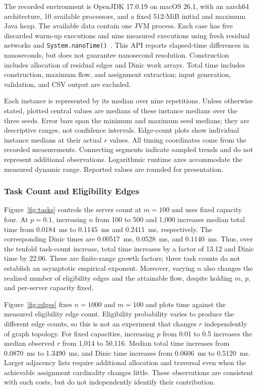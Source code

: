 \documentclass[conference]{IEEEtran}
\theoremstyle{definition}
\theoremstyle{remark}
\begin{document}
The recorded environment is OpenJDK 17.0.19 on macOS 26.1, with an aarch64
architecture, 10 available processors, and a fixed 512-MiB initial and maximum
Java heap. The available data contain one JVM process. Each case has five
discarded warm-up executions and nine measured executions using fresh residual
networks and \texttt{System.nanoTime()}~\cite{oracleNanoTime}. This API reports
elapsed-time differences in nanoseconds, but does not guarantee nanosecond
resolution. Construction includes allocation of
residual edges and Dinic work arrays. Total time includes construction, maximum
flow, and assignment extraction; input generation, validation, and CSV output
are excluded.

Each instance is represented by its median over nine repetitions. Unless
otherwise stated, plotted central values are medians of these instance medians
over the three seeds. Error bars span the minimum and maximum seed medians;
they are descriptive ranges, not confidence intervals. Edge-count plots show
individual instance medians at their actual $r$ values. All timing coordinates
come from the recorded measurements. Connecting segments indicate sampled
trends and do not represent additional observations. Logarithmic runtime axes
accommodate the measured dynamic range. Reported values are rounded for
presentation.

\subsubsection{Task Count and Eligibility Edges}
Figure~\ref{fig:tasks} controls the server count at $m=100$ and uses fixed
capacity four. At $p=0.1$, increasing $n$ from 100 to 500 and 1,000 increases
median total time from 0.0184~ms to 0.1145~ms and 0.2411~ms, respectively.
The corresponding Dinic times are 0.00517~ms, 0.0528~ms, and 0.1140~ms.
Thus, over the tenfold task-count increase, total time increases by a factor
of 13.12 and Dinic time by 22.06. These are finite-range growth factors;
three task counts do not establish an asymptotic empirical exponent.
Moreover, varying $n$ also changes the realized number of eligibility edges
and the attainable flow, despite holding $m$, $p$, and per-server capacity fixed.

Figure~\ref{fig:edges} fixes $n=1000$ and $m=100$ and plots time against
the measured eligibility edge count. Eligibility probability varies to produce
the different edge counts, so this is not an experiment that changes $r$
independently of graph topology. For fixed capacities, increasing $p$ from
0.01 to 0.5 increases the median observed $r$ from 1,014 to 50,116.
Median total time increases from 0.0870~ms to 1.3490~ms, and Dinic time
increases from 0.0606~ms to 0.5120~ms. Larger adjacency lists require
additional allocation and traversal even when the achievable assignment
cardinality changes little. These observations are consistent with such costs,
but do not independently identify their contribution.
\end{document}
